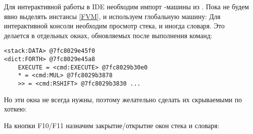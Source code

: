 \clearpage\noindent
Для интерактивной работы в IDE необходим импорт \F-машины из \metal.  
Пока не будем явно выделять инстансы  \ref{FVM}, и используем
глобальную машину:
\noindent
Для интерактивной консоли необходим просмотр стека, и иногда словаря. Это
делается в отдельных окнах, обновляемых после выполнения команд:
\begin{verbatim}
<stack:DATA> @7fc8029e45f0
<dict:FORTH> @7fc8029e45a8
    EXECUTE = <cmd:EXECUTE> @7fc8029b30e0
    * = <cmd:MUL> @7fc8029b3878
    >> = <cmd:RSHIFT> @7fc8029b3830 ...
\end{verbatim}

Но эти окна не всегда нужны, поэтому желательно сделать их скрываемыми по
хоткею:

\noindent
На кнопки F10/F11 назначим закрытие/открытие окон стека и словаря:

\secup